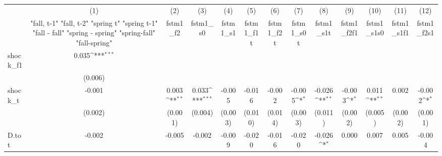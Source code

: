 {
\def\sym#1{\ifmmode^{#1}\else\(^{#1}\)\fi}
\begin{tabular}{l*{12}{c}}
\toprule
            &\multicolumn{1}{c}{(1)}&\multicolumn{1}{c}{(2)}&\multicolumn{1}{c}{(3)}&\multicolumn{1}{c}{(4)}&\multicolumn{1}{c}{(5)}&\multicolumn{1}{c}{(6)}&\multicolumn{1}{c}{(7)}&\multicolumn{1}{c}{(8)}&\multicolumn{1}{c}{(9)}&\multicolumn{1}{c}{(10)}&\multicolumn{1}{c}{(11)}&\multicolumn{1}{c}{(12)}\\
            &\multicolumn{1}{c}{  "fall, t-1" "fall, t-2" "spring t" "spring t-1"  "fall - fall" "spring - spring" "spring-fall" "fall-spring" }&\multicolumn{1}{c}{fstm1\_f2}&\multicolumn{1}{c}{fstm1\_s0}&\multicolumn{1}{c}{fstm1\_s1}&\multicolumn{1}{c}{fstm1\_f1t}&\multicolumn{1}{c}{fstm1\_f2t}&\multicolumn{1}{c}{fstm1\_s0t}&\multicolumn{1}{c}{fstm1\_s1t}&\multicolumn{1}{c}{fstm1\_f2f1}&\multicolumn{1}{c}{fstm1\_s1s0}&\multicolumn{1}{c}{fstm1\_s1f1}&\multicolumn{1}{c}{fstm1\_f2s1}\\
\midrule
shock\_f1    &       0.035\sym{***}&                     &                     &                     &                     &                     &                     &                     &                     &                     &                     &                     \\
            &     (0.006)         &                     &                     &                     &                     &                     &                     &                     &                     &                     &                     &                     \\
\addlinespace
shock\_t     &      -0.001         &       0.003\sym{**} &       0.033\sym{***}&      -0.005         &      -0.016         &      -0.002         &      -0.005\sym{*}  &      -0.026\sym{**} &      -0.003\sym{*}  &       0.011\sym{**} &       0.002         &      -0.002\sym{*}  \\
            &     (0.002)         &     (0.001)         &     (0.004)         &     (0.003)         &     (0.010)         &     (0.014)         &     (0.003)         &     (0.011)         &     (0.002)         &     (0.005)         &     (0.002)         &     (0.001)         \\
\addlinespace
D.tot       &      -0.002         &      -0.005         &      -0.002         &      -0.009         &      -0.020         &      -0.016         &      -0.020         &      -0.026\sym{*}  &       0.000         &       0.007         &       0.005         &      -0.004         \\

\end{tabular}}
